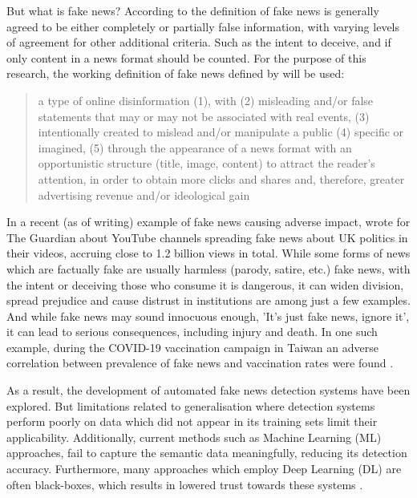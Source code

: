 \documentclass[stu,12pt,floatsintext,donotrepeattitle]{apa7}
\begin{document}
But what is fake news? According to \textcite{definition} the definition of fake news is generally agreed to be either completely or partially false information, with varying levels of agreement for other additional criteria. Such as the intent to deceive, and if only content in a news format should be counted. For the purpose of this research, the working definition of fake news defined by \textcite{definition} will be used: 

\begin{quote}
    a type of online disinformation (1), with (2) misleading
and/or false statements that may or may not be associated with real events, (3) intentionally
created to mislead and/or manipulate a public (4) specific or imagined, (5) through the
appearance of a news format with an opportunistic structure (title, image, content) to attract
the reader’s attention, in order to obtain more clicks and shares and, therefore, greater
advertising revenue and/or ideological gain \textcite{definition}
\end{quote} 

In a recent (as of writing) example of fake news causing adverse impact, \textcite{Savage-Guardian_2025} wrote for The Guardian about YouTube channels spreading fake news about UK politics in their videos, accruing close to 1.2 billion views in total. While some forms of news which are factually fake are usually harmless (parody, satire, etc.) fake news, with the intent or deceiving those who consume it is dangerous, it can widen division, spread prejudice and cause distrust in institutions are among just a few examples. And while fake news may sound innocuous enough, 'It's just fake news, ignore it', it can lead to serious consequences, including injury and death. In one such example, during the COVID-19 vaccination campaign in Taiwan an adverse correlation between prevalence of fake news and vaccination rates were found \parencite{vaccination}.

As a result, the development of automated fake news detection systems have been explored. But limitations related to generalisation where detection systems perform poorly on data which did not appear in its training sets \parencite{BERT-finetuning} limit their applicability. Additionally, current methods such as Machine Learning (ML) approaches, fail to capture the semantic data meaningfully, reducing its detection accuracy. Furthermore, many approaches which employ Deep Learning (DL) are often black-boxes, which results in lowered trust towards these systems \parencite{xai-bert}. 
\end{document}
